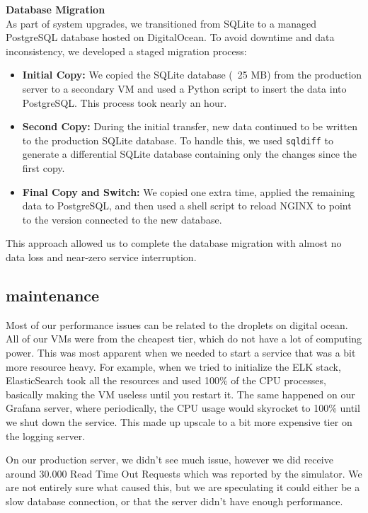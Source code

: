 \noindent \textbf{Database Migration}
\\
As part of system upgrades, we transitioned from SQLite to a managed PostgreSQL database hosted on DigitalOcean. To avoid downtime and data inconsistency, we developed a staged migration process:
\begin{itemize}
    \item \textbf{Initial Copy:} We copied the SQLite database (~25 MB) from the production server to a secondary VM and used a Python script to insert the data into PostgreSQL. This process took nearly an hour.
    \item \textbf{Second Copy:} During the initial transfer, new data continued to be written to the production SQLite database. To handle this, we used \texttt{sqldiff} to generate a differential SQLite database containing only the changes since the first copy.
    \item \textbf{Final Copy and Switch:} We copied one extra time, applied the remaining data to PostgreSQL, and then used a shell script to reload NGINX to point to the version connected to the new database.
\end{itemize}

This approach allowed us to complete the database migration with almost no data loss and near-zero service interruption.

\subsection{maintenance}

Most of our performance issues can be related to the droplets on digital ocean. All of our VMs were from the cheapest tier, which do not have a lot of computing power. This was most apparent when we needed to start a service that was a bit more resource heavy. For example, when we tried to initialize the ELK stack, ElasticSearch took all the resources and used 100\% of the CPU processes, basically making the VM useless until you restart it. The same happened on our Grafana server, where periodically, the CPU usage would skyrocket to 100\% until we shut down the service. This made up upscale to a bit more expensive tier on the logging server.

On our production server, we didn't see much issue, however we did receive around 30.000 Read Time Out Requests which was reported by the simulator. We are not entirely sure what caused this, but we are speculating it could either be a slow database connection, or that the server didn't have enough performance.

